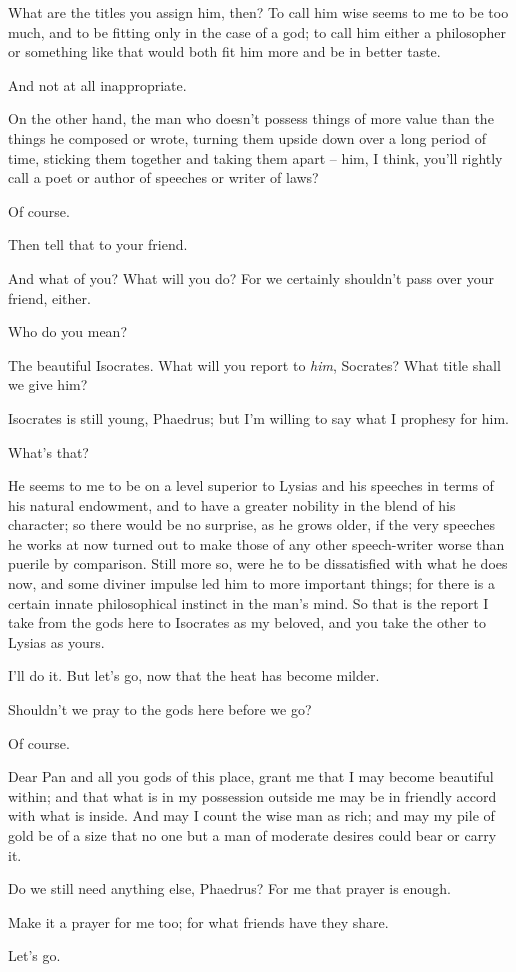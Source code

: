 What are the titles you assign him, then? To call him
wise seems to me to be too much, and to be fitting only in the case of a
god; to call him either a
philosopher or something
like that would both fit him more  and be in better taste.

And not at all inappropriate.

On the other hand, the man who doesn't possess things of more
value than the things he composed or wrote, turning them upside down
over a long period of time, sticking  them together and taking
them apart -- him, I think, you'll rightly call a poet or author of
speeches or writer of laws?

Of course.

Then tell that to your friend.

And what of you? What will you do? For we certainly 
shouldn't pass over your friend, either.

Who do you mean?

The beautiful
Isocrates. What will you
report to {\em him}, Socrates? What title shall we give him?

Isocrates is still young, Phaedrus; but I'm willing to
 say what I prophesy for him. 

What's that?

He seems to me to be on a level superior to Lysias and his
speeches in terms of his natural endowment, and to have a greater
nobility in the blend of his character; so there  would be no
surprise, as he grows older, if the very speeches he works at now turned
out to make those of any other speech-writer worse than puerile by
comparison. Still more so, were he to be dissatisfied with what he does
now, and some diviner impulse led him to more important things; for
there is a certain innate philosophical instinct in the man's mind. So
that is the  report I take from the gods here to Isocrates as my
beloved, and you take the other to Lysias as yours.

 I'll do it. But let's go, now that the heat has become
milder.

Shouldn't we pray to the gods here before we go?

Of course.

Dear Pan and all you gods of this place, grant me that I may
become beautiful within; and that what is in my  possession
outside me may be in friendly accord with what is inside. And may I
count the wise man as rich; and may my pile of gold be of a size that no
one but a man of moderate
desires could bear or
carry it.

 Do we still need anything else, Phaedrus? For me that prayer is
enough.

Make it a prayer for me too; for what friends have they share.

Let's go.

\stoptext
